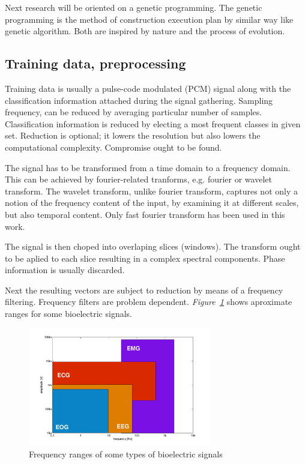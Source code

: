 \documentclass[a4paper]{IEEEtran}
\begin{document}
Next research will be oriented on a genetic programming. The genetic programming 
is the method of construction execution plan by similar way like genetic
algorithm. Both are inspired by nature and the process of evolution.


\subsection{Training data, preprocessing}
Training data is usually a pulse-code modulated (PCM) signal \cite{pcm} along with the
classification information attached during the signal gathering.
Sampling frequency,
can be reduced by averaging particular number of samples. Classification
information is reduced by electing a most frequent classes in given set.
Reduction is optional; it lowers the resolution but also lowers the 
computational complexity. Compromise ought to be found.

The signal has to be transformed %
from a time domain to a frequency domain.
This can be achieved by fourier-related tranforms, e.g. fourier\cite{fourier} or
wavelet\cite{wavelet} transform.
The wavelet transform, unlike fourier transform, captures not only a notion of the 
frequency content of the input,
by examining it at different scales, but also temporal content.
Only fast fourier transform has been used in this work.

The signal is then choped into overlaping slices (windows).
The transform ought to be aplied to each slice resulting in
a complex spectral components.
Phase information is usually discarded.

Next the resulting vectors are subject to reduction by means of a
frequency filtering. Frequency filters are problem dependent.
\textit{Figure~\ref{fig:filters2}} shows aproximate ranges for some bioelectric signals.
\begin{figure}[h]
	\centering
	\includegraphics[width=80mm]{filters2}
	\caption{Frequency ranges of some types of bioelectric signals}
	\label{fig:filters2}
\end{figure}
\end{document}
